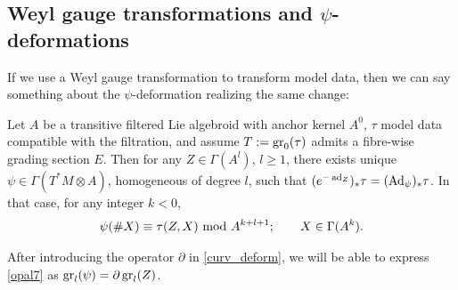 \documentclass[leqno,12pt]{amsart} %
\begin{document}
\subsection{Weyl gauge transformations and $\psi$-deformations}\label{gauge_transforms}

If we use a Weyl gauge transformation to transform model data, then we can say something
about the $\psi$-deformation realizing the same change:

\begin{proposition}
  Let $A$ be a transitive filtered Lie algebroid with anchor kernel $A^0$, $\tau$ model
  data compatible with the filtration, and assume $T := \operatorname{\operatorname{gr}}_0(\tau)$ admits a
  fibre-wise grading section $E$. Then for any $Z \in \Gamma(A^l)$, $l \ge 1$, there
  exists unique $\psi \in \Gamma(T^*\!M \otimes A)$, homogeneous of degree $l$, such
  that $(e^{-\operatorname{ad}_Z})_*\tau = (\operatorname{Ad}_\psi)_* \tau$. In that case, for any
  integer $k < 0$,
  \begin{equation}
    \label{opal7}
    \psi(\#X) \equiv \tau(Z, X) ~\mathrm{mod}~ A^{k+l+1};\qquad X \in \Gamma(A^k).
  \end{equation}
\end{proposition}
%
\begin{remark}
After introducing the operator $\partial$ in \ref{curv_deform}, we will be able to express
\eqref{opal7} as $\operatorname{\operatorname{gr}}_l(\psi) = \partial \operatorname{\operatorname{gr}}_l(Z)$.
\end{remark}
%
\end{document}
